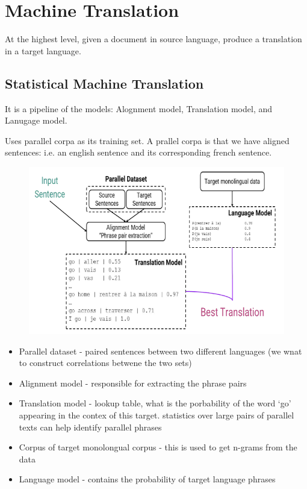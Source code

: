 \documentclass[11pt]{article}
\begin{document}


\tableofcontents

\clearpage

\section{Machine Translation}

At the highest level, given a document in source language, produce a translation in a target language.

\subsection{Statistical Machine Translation}

It is a pipeline of the models: Alognment model, Translation model, and Lanugage model.

Uses parallel corpa as its training set. A prallel corpa is that we have aligned sentences: i.e. an english sentence and its corresponding french sentence.

\begin{figure}[H]
    \centering
    \includegraphics*[width=.6\linewidth]{figures/smt-idea.png}
\end{figure}

\begin{itemize}
    \item Parallel dataset - paired sentences between two different languages (we wnat to construct correlations betwene the two sets)
    \item Alignment model - responsible for extracting the phrase pairs    
    \item Translation model - lookup table, what is the porbability of the word `go' appearing in the contex of this target. statistics over large pairs of parallel texts can
    help identify parallel phrases
    \item Corpus of target monolongual corpus - this is used to get n-grams from the data
    \item Language model - contains the probability of target language phrases 
\end{itemize}
\end{document}
